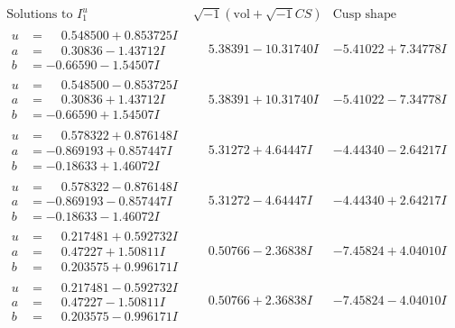 \documentclass[1p]{elsarticle_modified}
\theoremstyle{definition}
\newcommand{\I}{\sqrt{-1}}
\begin{document}
$$\begin{array}{c|c|c}  
\text{Solutions to }I^u_{1}& \I (\text{vol} + \sqrt{-1}CS) & \text{Cusp shape}\\
 \hline 
\begin{aligned}
u &= \phantom{-}0.548500 + 0.853725 I \\
a &= \phantom{-}0.30836 - 1.43712 I \\
b &= -0.66590 - 1.54507 I\end{aligned}
 & \phantom{-}5.38391 - 10.31740 I & -5.41022 + 7.34778 I \\ \hline\begin{aligned}
u &= \phantom{-}0.548500 - 0.853725 I \\
a &= \phantom{-}0.30836 + 1.43712 I \\
b &= -0.66590 + 1.54507 I\end{aligned}
 & \phantom{-}5.38391 + 10.31740 I & -5.41022 - 7.34778 I \\ \hline\begin{aligned}
u &= \phantom{-}0.578322 + 0.876148 I \\
a &= -0.869193 + 0.857447 I \\
b &= -0.18633 + 1.46072 I\end{aligned}
 & \phantom{-}5.31272 + 4.64447 I & -4.44340 - 2.64217 I \\ \hline\begin{aligned}
u &= \phantom{-}0.578322 - 0.876148 I \\
a &= -0.869193 - 0.857447 I \\
b &= -0.18633 - 1.46072 I\end{aligned}
 & \phantom{-}5.31272 - 4.64447 I & -4.44340 + 2.64217 I \\ \hline\begin{aligned}
u &= \phantom{-}0.217481 + 0.592732 I \\
a &= \phantom{-}0.47227 + 1.50811 I \\
b &= \phantom{-}0.203575 + 0.996171 I\end{aligned}
 & \phantom{-}0.50766 - 2.36838 I & -7.45824 + 4.04010 I \\ \hline\begin{aligned}
u &= \phantom{-}0.217481 - 0.592732 I \\
a &= \phantom{-}0.47227 - 1.50811 I \\
b &= \phantom{-}0.203575 - 0.996171 I\end{aligned}
 & \phantom{-}0.50766 + 2.36838 I & -7.45824 - 4.04010 I \\ \hline\begin{aligned}

\end{aligned}
\end{array}$$
\end{document}
